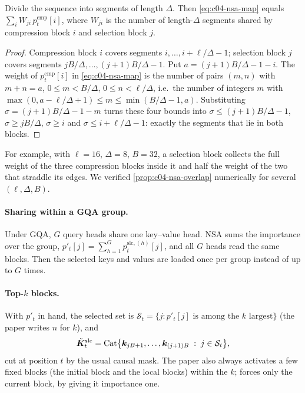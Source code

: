 \begin{proposition}\label{prop:c04-nsa-overlap}
Divide the sequence into segments of length $\Delta$. Then \eqref{eq:c04-nsa-map} equals
$\sum_i W_{ji}\,p^{\mathrm{cmp}}_t[i]$, where $W_{ji}$ is the number of length-$\Delta$
segments shared by compression block $i$ and selection block $j$.
\end{proposition}
\begin{proof}
Compression block $i$ covers segments $i,\dots,i+\ell/\Delta-1$; selection block $j$ covers
segments $jB/\Delta,\dots,(j+1)B/\Delta-1$. Put $a=(j+1)B/\Delta-1-i$. The weight of
$p^{\mathrm{cmp}}_t[i]$ in \eqref{eq:c04-nsa-map} is the number of pairs $(m,n)$ with $m+n=a$,
$0\le m<B/\Delta$, $0\le n<\ell/\Delta$, i.e.\ the number of integers $m$ with
$\max(0,a-\ell/\Delta+1)\le m\le\min(B/\Delta-1,a)$. Substituting
$\sigma=(j+1)B/\Delta-1-m$ turns these four bounds into $\sigma\le(j+1)B/\Delta-1$,
$\sigma\ge jB/\Delta$, $\sigma\ge i$ and $\sigma\le i+\ell/\Delta-1$: exactly the segments that
lie in both blocks.
\end{proof}

For example, with $\ell=16$, $\Delta=8$, $B=32$, a selection block collects the full weight of
the three compression blocks inside it and half the weight of the two that straddle its edges.
We verified \cref{prop:c04-nsa-overlap} numerically for several $(\ell,\Delta,B)$.

\paragraph{Sharing within a GQA group.}
Under GQA, $G$ query heads share one key--value head. NSA sums the importance over the group,
$p'_t[j]=\sum_{h=1}^{G}p^{\mathrm{slc},(h)}_t[j]$, and all $G$ heads read the same blocks. Then
the selected keys and values are loaded once per group instead of up to $G$ times.

\paragraph{Top-$k$ blocks.}
With $p'_t$ in hand, the selected set is
$\mathcal{S}_t=\{j: p'_t[j]\text{ is among the }k\text{ largest}\}$ (the paper writes $n$ for
$k$), and
\begin{equation}\label{eq:c04-nsa-slc}
  \tilde{\bm{K}}^{\mathrm{slc}}_t=\mathrm{Cat}\big\{\bm{k}_{jB+1},\dots,\bm{k}_{(j+1)B}\;:\;j\in\mathcal{S}_t\big\},
\end{equation}
cut at position $t$ by the usual causal mask. The paper also always activates a few fixed blocks
(the initial block and the local blocks) within the $k$; \fla{} forces only the current block,
by giving it importance one.

